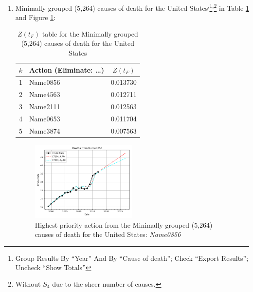 \documentclass[10pt, a4paper, twocolumn]{IEEEconf}
\begin{document}
\begin{enumerate}
  \item Minimally grouped (5,264) causes of death for the United States\cite{centers2017underlying}\textsuperscript{,}\footnote{Group Results By \enquote{Year} And By \enquote{Cause of death}; Check \enquote{Export Results}; Uncheck \enquote{Show Totals}}\textsuperscript{,}\footnote{Without $S_4$ due to the sheer number of causes.} in Table \ref{table:ztable7} and Figure \ref{fig:k7}:
    \begin{table}[H]
      \centering
      \begin{tabular}{clc}
        \toprule
          $k$ & Action (Eliminate: \ldots) & $Z(t_F)$ \\
        \midrule
          1   & Name0856 & 0.013730 \\
          2   & Name4563 & 0.012711 \\
          3   & Name2111 & 0.012563 \\
          4   & Name0653 & 0.011704 \\
          5   & Name3874 & 0.007563 \\
        \bottomrule
      \end{tabular}
      \caption{$Z(t_F)$ table for the Minimally grouped (5,264) causes of death for the United States}
      \label{table:ztable7}
    \end{table}
    \begin{figure}[H]
      \centering
      \includegraphics[width=0.5\textwidth]{results/US_ICD10_MINIMALLY_GROUPED/Name0856_ets.png}
      \caption{Highest priority action from the Minimally grouped (5,264) causes of death for the United States: \textit{Name0856}}\label{fig:k7}
    \end{figure}


\end{enumerate}
\end{document}
